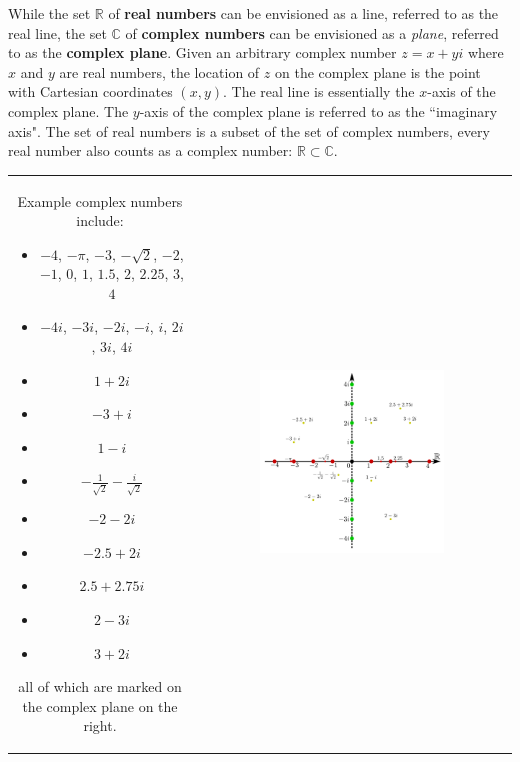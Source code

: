 \documentclass{article}
\begin{document}
While the set \(\mathbb{R}\) of {\bf real numbers} can be envisioned as a line, referred to as the real line, the set \(\mathbb{C}\) of {\bf complex numbers} can be envisioned as a \emph{plane}, referred to as the {\bf complex plane}. Given an arbitrary complex number \(z = x + yi\) where \(x\) and \(y\) are real numbers, the location of \(z\) on the complex plane is the point with Cartesian coordinates \((x,y)\). The real line is essentially the \(x\)-axis of the complex plane. The \(y\)-axis of the complex plane is referred to as the ``imaginary axis". The set of real numbers is a subset of the set of complex numbers, every real number also counts as a complex number: \(\mathbb{R} \subset \mathbb{C}\). \\
\begin{tabular}{cc}
\parbox{0.4\textwidth}{Example complex numbers include:
\begin{itemize}
\item \(-4\), \(-\pi\), \(-3\), \(-\sqrt{2}\), \(-2\), \(-1\), \(0\), \(1\), \(1.5\), \(2\), \(2.25\), \(3\), \(4\)
\item \(-4i\), \(-3i\), \(-2i\), \(-i\), \(i\), \(2i\), \(3i\), \(4i\)
\item \(1 + 2i\)
\item \(-3 + i\)
\item \(1 - i\)
\item \(-\frac{1}{\sqrt{2}} - \frac{i}{\sqrt{2}}\)
\item \(-2 - 2i\)
\item \(-2.5 + 2i\)
\item \(2.5 + 2.75i\)
\item \(2 - 3i\)
\item \(3 + 2i\)
\end{itemize}
all of which are marked on the complex plane on the right.
} & \parbox{0.6\textwidth}{
\includegraphics[width = 0.6\textwidth]{the_complex_plane_1}
}
\end{tabular}
\end{document}
